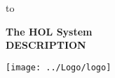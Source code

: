 

\begin{titlepage}
\null\vskip-47pt
\hbox to 

\setcounter{page}{1}                      %

\vspace*{60mm}


\begin{center}
 {\Huge\bf The HOL System}\\[0.4cm]
{\LARGE\bf DESCRIPTION}\\[2.5cm]
\end{center}

\begin{center}
\texttt{[image: ../Logo/logo]}
\end{center}

\vfill
\end{titlepage}

\thispagestyle{empty}
\mbox{}
\newpage

